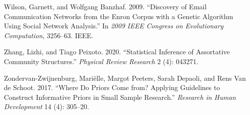 \documentclass[
  12pt,
  a4paper,
  DIV=11,
  numbers=noendperiod,
  twoside,
  open=any]{scrartcl}
\newlength{\cslhangindent}
\newenvironment{CSLReferences}[2] %
 {\begin{list}{}{%
  \setlength{\itemindent}{0pt}
  \setlength{\leftmargin}{0pt}
  \setlength{\parsep}{0pt}
  \ifodd #1
   \setlength{\leftmargin}{\cslhangindent}
   \setlength{\itemindent}{-1\cslhangindent}
  \fi
  \setlength{\itemsep}{#2\baselineskip}}}
 {\end{list}}
\begin{document}
\begin{CSLReferences}{1}{0}
Wilson, Garnett, and Wolfgang Banzhaf. 2009. {``Discovery of Email
Communication Networks from the Enron Corpus with a Genetic Algorithm
Using Social Network Analysis.''} In \emph{2009 IEEE Congress on
Evolutionary Computation}, 3256--63. IEEE.

Zhang, Lizhi, and Tiago Peixoto. 2020. {``Statistical Inference of
Assortative Community Structures.''} \emph{Physical Review Research} 2
(4): 043271.

Zondervan-Zwijnenburg, Mariëlle, Margot Peeters, Sarah Depaoli, and Rens
Van de Schoot. 2017. {``Where Do Priors Come from? Applying Guidelines
to Construct Informative Priors in Small Sample Research.''}
\emph{Research in Human Development} 14 (4): 305--20.

\end{CSLReferences}
\end{document}
